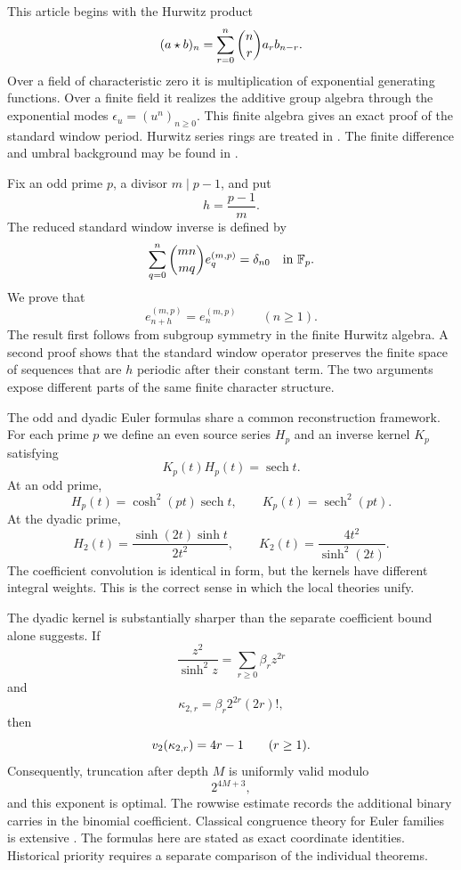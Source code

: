 This article begins with the Hurwitz product
\[
(a\mathbin{\star} b)_n
=
\sum_{r=0}^{n}
\binom nr a_rb_{n-r}.
\]
Over a field of characteristic zero it is multiplication of exponential generating functions. Over a finite field it realizes the additive group algebra through the exponential modes \(\epsilon_u=(u^n)_{n\geq0}\). This finite algebra gives an exact proof of the standard window period. Hurwitz series rings are treated in \cite{Keigher1997,BarberoCerrutiMurru2018}. The finite difference and umbral background may be found in \cite{Roman1984,Comtet1974,GrahamKnuthPatashnik1994}.

Fix an odd prime \(p\), a divisor \(m\mid p-1\), and put
\[
h=\frac{p-1}{m}.
\]
The reduced standard window inverse is defined by
\[
\sum_{q=0}^{n}
\binom{mn}{mq}e_q^{(m,p)}
=
\delta_{n0}
\quad\text{in }\mathbb F_p.
\]
We prove that
\[
e_{n+h}^{(m,p)}=e_n^{(m,p)}
\qquad(n\geq1).
\]
The result first follows from subgroup symmetry in the finite Hurwitz algebra. A second proof shows that the standard window operator preserves the finite space of sequences that are \(h\) periodic after their constant term. The two arguments expose different parts of the same finite character structure.

The odd and dyadic Euler formulas share a common reconstruction framework. For each prime \(p\) we define an even source series \(H_p\) and an inverse kernel \(K_p\) satisfying
\[
K_p(t)H_p(t)=\operatorname{sech}t.
\]
At an odd prime,
\[
H_p(t)=\cosh^2(pt)\operatorname{sech}t,
\qquad
K_p(t)=\operatorname{sech}^2(pt).
\]
At the dyadic prime,
\[
H_2(t)=\frac{\sinh(2t)\sinh t}{2t^2},
\qquad
K_2(t)=\frac{4t^2}{\sinh^2(2t)}.
\]
The coefficient convolution is identical in form, but the kernels have different integral weights. This is the correct sense in which the local theories unify.

The dyadic kernel is substantially sharper than the separate coefficient bound alone suggests. If
\[
\frac{z^2}{\sinh^2z}
=
\sum_{r\geq0}\beta_rz^{2r}
\]
and
\[
\kappa_{2,r}=\beta_r2^{2r}(2r)!,
\]
then
\[
v_2(\kappa_{2,r})=4r-1
\qquad(r\geq1).
\]
Consequently, truncation after depth \(M\) is uniformly valid modulo
\[
2^{4M+3},
\]
and this exponent is optimal. The rowwise estimate records the additional binary carries in the binomial coefficient. Classical congruence theory for Euler families is extensive \cite{CarlitzLevine1960,Young1999,Young2001,Sun2008,Chen2004}. The formulas here are stated as exact coordinate identities. Historical priority requires a separate comparison of the individual theorems.

